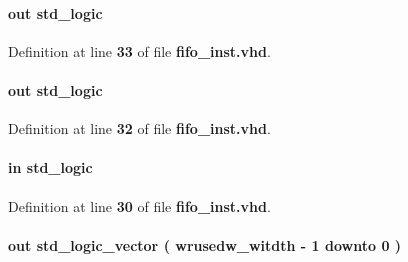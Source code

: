 \paragraph[{wrempty}]{ {\bfseries \textcolor{keywordflow}{out}\textcolor{vhdlchar}{ }} {\bfseries \textcolor{comment}{std\+\_\+logic}\textcolor{vhdlchar}{ }} \hspace{0.3cm}{\ttfamily [Port]}}\label{classfifo__inst_af99df303b07fcfb5541042f84f1f7caf}


Definition at line {\bf 33} of file {\bf fifo\+\_\+inst.\+vhd}.

\paragraph[{wrfull}]{ {\bfseries \textcolor{keywordflow}{out}\textcolor{vhdlchar}{ }} {\bfseries \textcolor{comment}{std\+\_\+logic}\textcolor{vhdlchar}{ }} \hspace{0.3cm}{\ttfamily [Port]}}\label{classfifo__inst_a887d61823ee681dd0d4b0f5375876a2c}


Definition at line {\bf 32} of file {\bf fifo\+\_\+inst.\+vhd}.

\paragraph[{wrreq}]{ {\bfseries \textcolor{keywordflow}{in}\textcolor{vhdlchar}{ }} {\bfseries \textcolor{comment}{std\+\_\+logic}\textcolor{vhdlchar}{ }} \hspace{0.3cm}{\ttfamily [Port]}}\label{classfifo__inst_ac372a497739b781701e8ecd52a1b7c50}


Definition at line {\bf 30} of file {\bf fifo\+\_\+inst.\+vhd}.

\paragraph[{wrusedw}]{ {\bfseries \textcolor{keywordflow}{out}\textcolor{vhdlchar}{ }} {\bfseries \textcolor{comment}{std\+\_\+logic\+\_\+vector}\textcolor{vhdlchar}{ }\textcolor{vhdlchar}{(}\textcolor{vhdlchar}{ }\textcolor{vhdlchar}{ }\textcolor{vhdlchar}{ }\textcolor{vhdlchar}{ }{\bfseries {\bf wrusedw\+\_\+witdth}} \textcolor{vhdlchar}{-\/}\textcolor{vhdlchar}{ } \textcolor{vhdldigit}{1} \textcolor{vhdlchar}{ }\textcolor{keywordflow}{downto}\textcolor{vhdlchar}{ }\textcolor{vhdlchar}{ } \textcolor{vhdldigit}{0} \textcolor{vhdlchar}{ }\textcolor{vhdlchar}{)}\textcolor{vhdlchar}{ }} \hspace{0.3cm}{\ttfamily [Port]}}\label{classfifo__inst_aa966303d51b2645a5d726fc1500305ee}



